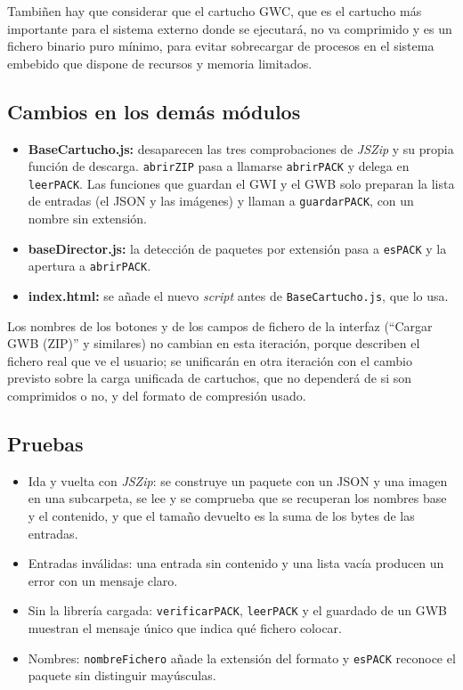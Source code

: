 Tambiñen hay que considerar que el cartucho GWC, que es el cartucho más importante para el sistema externo donde se ejecutará, no va comprimido y es un fichero binario puro mínimo, para evitar sobrecargar de procesos en el sistema embebido que dispone de recursos y memoria limitados.

\subsection{Cambios en los demás módulos}
\label{sec:F5I11Cambios}

\begin{itemize}
	\item \textbf{BaseCartucho.js:} desaparecen las tres comprobaciones de \emph{JSZip} y su propia función de descarga. \texttt{abrirZIP} pasa a llamarse \texttt{abrirPACK} y delega en \texttt{leerPACK}. Las funciones que guardan el GWI y el GWB solo preparan la lista de entradas (el JSON y las imágenes) y llaman a \texttt{guardarPACK}, con un nombre sin extensión.
	\item \textbf{baseDirector.js:} la detección de paquetes por extensión pasa a \texttt{esPACK} y la apertura a \texttt{abrirPACK}.
	\item \textbf{index.html:} se añade el nuevo \emph{script} antes de \texttt{BaseCartucho.js}, que lo usa.
\end{itemize}

Los nombres de los botones y de los campos de fichero de la interfaz (``Cargar GWB (ZIP)'' y similares) no cambian en esta iteración, porque describen el fichero real que ve el usuario; se unificarán en otra iteración con el cambio previsto sobre la carga unificada de cartuchos, que no dependerá de si son comprimidos o no, y del formato de compresión usado.

\subsection{Pruebas}
\label{sec:F5I11Pruebas}

\begin{itemize}
	\item Ida y vuelta con \emph{JSZip}: se construye un paquete con un JSON y una imagen en una subcarpeta, se lee y se comprueba que se recuperan los nombres base y el contenido, y que el tamaño devuelto es la suma de los bytes de las entradas.
	\item Entradas inválidas: una entrada sin contenido y una lista vacía producen un error con un mensaje claro.
	\item Sin la librería cargada: \texttt{verificarPACK}, \texttt{leerPACK} y el guardado de un GWB muestran el mensaje único que indica qué fichero colocar.
	\item Nombres: \texttt{nombreFichero} añade la extensión del formato y \texttt{esPACK} reconoce el paquete sin distinguir mayúsculas.
\end{itemize}


